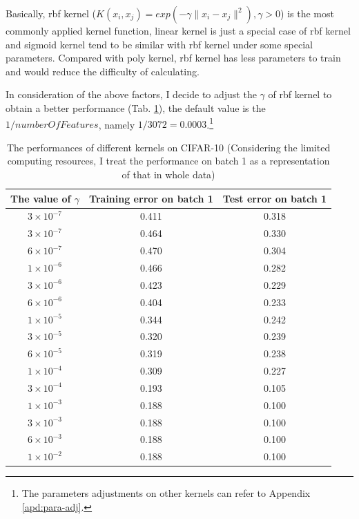 \documentclass[12pt,a4paper]{article}
\theoremstyle{definition}
\begin{document}
Basically, rbf kernel ($K(x_i, x_j)=exp(-\gamma\|x_i-x_j\|^2), \gamma>0$) is the most commonly applied kernel function, linear kernel is just a special case of rbf kernel and sigmoid kernel tend to be similar with rbf kernel under some special parameters. Compared with poly kernel, rbf kernel has less parameters to train and would reduce the difficulty of calculating.

\vspace{0.01\linewidth}
In consideration of the above factors, I decide to adjust the $\gamma$ of rbf kernel to obtain a better performance (Tab. \ref{tab:rbf-para}), the default value is the $1/numberOfFeatures$, namely $1/3072=0.0003$.\footnote{The parameters adjustments on other kernels can refer to Appendix \ref{apd:para-adj}.}

\begin{table}[H]
	\renewcommand\arraystretch{1.35}
	\caption{The performances of different kernels on CIFAR-10 (Considering the limited computing resources, I treat the performance on batch 1 as a representation of that in whole data)}
	\label{tab:rbf-para}
	\centering
	
	\begin{tabular}{c|c|c}
		\centering
		The value of $\gamma$ & Training error on batch 1 & Test error on batch 1 \\
		\hline
		\hline
		
		$3 \times 10^{-7}$ & 0.411 & 0.318 \\
		$3 \times 10^{-7}$ & 0.464 & 0.330 \\
		$6 \times 10^{-7}$ & 0.470 & 0.304 \\
		$1 \times 10^{-6}$ & 0.466 & 0.282 \\
		$3 \times 10^{-6}$ & 0.423 & 0.229 \\
		$6 \times 10^{-6}$ & 0.404 & 0.233 \\
		$1 \times 10^{-5}$ & 0.344 & 0.242 \\
		$3 \times 10^{-5}$ & 0.320 & 0.239 \\
		$6 \times 10^{-5}$ & 0.319 & 0.238 \\
		$1 \times 10^{-4}$ & 0.309 & 0.227 \\
		$3 \times 10^{-4}$ & 0.193 & 0.105 \\
		$1 \times 10^{-3}$ & 0.188 & 0.100 \\
		$3 \times 10^{-3}$ & 0.188 & 0.100 \\
		$6 \times 10^{-3}$ & 0.188 & 0.100 \\
		$1 \times 10^{-2}$ & 0.188 & 0.100 \\
	\end{tabular}
\end{table}
\end{document}
